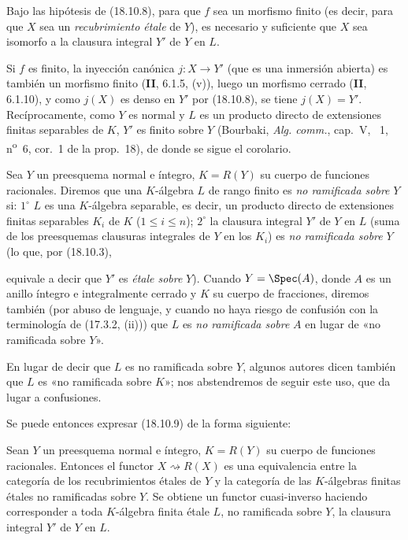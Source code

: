 \begin{corollary}[18.10.9]
\label{IV.18.10.9}
Bajo las hipótesis de \textup{(18.10.8)}, para que $f$ sea un morfismo finito \textup{(es decir, para que $X$ sea un \emph{recubrimiento étale} de $Y$)}, es necesario y suficiente que $X$ sea isomorfo a la clausura integral $Y'$ de $Y$ en $L$.
\end{corollary}

Si $f$ es finito, la inyección canónica $j:X\to Y'$ (que es una inmersión abierta) es también un morfismo finito (\textbf{II}, 6.1.5, (v)), luego un morfismo cerrado (\textbf{II}, 6.1.10), y como $j(X)$ es denso en $Y'$ por (18.10.8), se tiene $j(X)=Y'$. Recíprocamente, como $Y$ es normal y $L$ es un producto directo de extensiones finitas separables de $K$, $Y'$ es finito sobre $Y$ (Bourbaki, \emph{Alg. comm.}, cap.~V, \textsection~1, n\textsuperscript{o}~6, cor.~1 de la prop.~18), de donde se sigue el corolario.

\begin{env}[18.10.10]
\label{IV.18.10.10}
Sea $Y$ un preesquema normal e íntegro, $K=R(Y)$ su cuerpo de funciones racionales. Diremos que una $K$-álgebra $L$ de rango finito es \emph{no ramificada sobre} $Y$ si: $1^\circ$ $L$ es una $K$-álgebra separable, es decir, un producto directo de extensiones finitas separables $K_i$ de $K$ ($1\leq i\leq n$); $2^\circ$ la clausura integral $Y'$ de $Y$ en $L$ (suma de los preesquemas clausuras integrales de $Y$ en los $K_i$) es \emph{no ramificada sobre} $Y$ (lo que, por (18.10.3),


equivale a decir que $Y'$ es \emph{étale sobre} $Y$). Cuando $Y=\Spec(A)$, donde $A$ es un anillo íntegro e integralmente cerrado y $K$ su cuerpo de fracciones, diremos también (por abuso de lenguaje, y cuando no haya riesgo de confusión con la terminología de (17.3.2, (ii))) que $L$ es \emph{no ramificada sobre} $A$ en lugar de «no ramificada sobre $Y$».
\end{env}

\begin{remark}[18.10.11]
\label{IV.18.10.11}
En lugar de decir que $L$ es no ramificada sobre $Y$, algunos autores dicen también que $L$ es «no ramificada sobre $K$»; nos abstendremos de seguir este uso, que da lugar a confusiones.
\end{remark}

Se puede entonces expresar (18.10.9) de la forma siguiente:

\begin{corollary}[18.10.12]
\label{IV.18.10.12}
Sean $Y$ un preesquema normal e íntegro, $K=R(Y)$ su cuerpo de funciones racionales. Entonces el functor $X\rightsquigarrow R(X)$ es una equivalencia entre la categoría de los recubrimientos étales de $Y$ y la categoría de las $K$-álgebras finitas étales \textup{no ramificadas} sobre $Y$. Se obtiene un functor cuasi-inverso haciendo corresponder a toda $K$-álgebra finita étale $L$, no ramificada sobre $Y$, la clausura integral $Y'$ de $Y$ en $L$.
\end{corollary}


